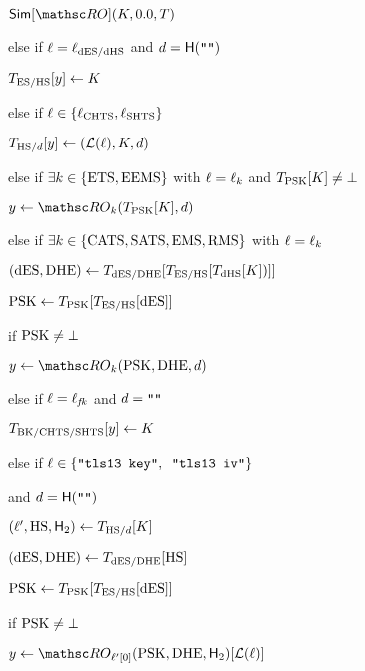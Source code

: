 \begin{figure}[tp]
\begin{minipage}[t]{0.49\textwidth}
\begin{oracle}{$\simulator[\RO](\hmackey, \hmactext, \rlookuptable)$}
			\item else if $\ell = \ell_{\mathrm{dES}/\mathrm{dHS}}$ and $d = \mathsf{H}(\texttt{""})$
			\item \quad $T_{\mathrm{ES}/\mathrm{HS}}[y] \gets K$
			
			\item  else if $\ell \in \{\ell_{\mathrm{CHTS}}, \ell_{\mathrm{SHTS}}\}$
			\item \quad $T_{\mathrm{HS}/d}[y] \gets (\mathcal{L}(\ell), K, d)$
			
			\item else if $\exists k \in \{\mathrm{ETS}, \mathrm{EEMS}\}$ with  $\ell  = \ell_k$ and $T_{\mathrm{PSK}}[K] \neq \bot$
			\item \quad $\simOut \gets \RO_{k}(\rlookuptable_{\psk}[\hmackey],\hashcontext)$
			
			\item else if $\exists k \in \{\mathrm{CATS}, \mathrm{SATS}, \mathrm{EMS}, \mathrm{RMS}\}$ with  $\ell  = \ell_k$
			\item \quad $(\mathrm{dES}, \mathrm{DHE}) \gets T_{\mathrm{dES}/\mathrm{DHE}}[T_{\mathrm{ES}/\mathrm{HS}}[ T_{\mathrm{dHS}}[K])]]$
			\item \quad $\mathrm{PSK} \gets T_{\mathrm{PSK}}[T_{\mathrm{ES}/\mathrm{HS}}[ \mathrm{dES}]]$
			\item \quad if $\mathrm{PSK}\neq \bot$
			\item \quad \quad  $\simOut \gets \RO_{k}(\psk, \dhe, \hashcontext)$ 
			
			\item else if $\ell = \ell_{\mathit{fk}}$ and $d = \texttt{""}$ 
			\item \quad $T_{\mathrm{BK}/\mathrm{CHTS}/\mathrm{SHTS}}[y] \gets K$
			
			\item else if $\ell \in \{\texttt{"tls13 key"}, \texttt{ "tls13 iv"} \}$
			\item \quad and $d = \mathsf{H}(\texttt{""})$
			\item \quad $(\ell', \mathrm{HS}, \mathsf{H}_2) \gets T_{\mathrm{HS}/d}[K]$
			\item \quad $(\mathrm{dES}, \mathrm{DHE}) \gets T_{\mathrm{dES}/\mathrm{DHE}}[\mathrm{HS}]$
			\item \quad $\mathrm{PSK} \gets T_{\mathrm{PSK}}[T_{\mathrm{ES}/\mathrm{HS}}[ \mathrm{dES}]]$
			\item \quad if $\mathrm{PSK} \neq \bot$ 
			\item \quad \quad $y \gets \RO_{\kdflbl'[0]}(\psk, \dhe, \hash_2)[	\lblT(\kdflbl)]$
			\item []
			

\end{oracle}
\end{minipage}
\end{figure}
